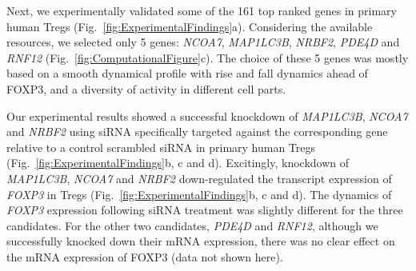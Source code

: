 \documentclass[oneside, 10pt, a4paper, twocolumn]{article}
\begin{document}

Next, we experimentally validated some of the 161 top ranked genes in primary human Tregs (Fig.~\ref{fig:ExperimentalFindings}a). Considering the available resources, we selected only 5 genes: \textit{NCOA7}, \textit{MAP1LC3B}, \textit{NRBF2}, \textit{PDE4D} and \textit{RNF12} (Fig.~\ref{fig:ComputationalFigure}c). The choice of these 5 genes was mostly based on a smooth dynamical profile with rise and fall dynamics ahead of FOXP3, and a diversity of activity in different cell parts. 


Our experimental results showed a  successful knockdown of \textit{MAP1LC3B}, \textit{NCOA7} and \textit{NRBF2} using siRNA specifically targeted against the corresponding gene relative to a control scrambled siRNA in primary human Tregs (Fig.~\ref{fig:ExperimentalFindings}b, c and d). Excitingly, knockdown of \textit{MAP1LC3B}, \textit{NCOA7} and \textit{NRBF2} down-regulated the transcript expression of \textit{FOXP3} in Tregs (Fig.~\ref{fig:ExperimentalFindings}b, c and d). The dynamics of \textit{FOXP3} expression following siRNA treatment was slightly different for the three candidates. 
For the other two candidates, \textit{PDE4D} and \textit{RNF12}, although we successfully knocked down their mRNA expression, there was no clear effect on the mRNA expression of FOXP3 (data not shown here). 
\end{document}

